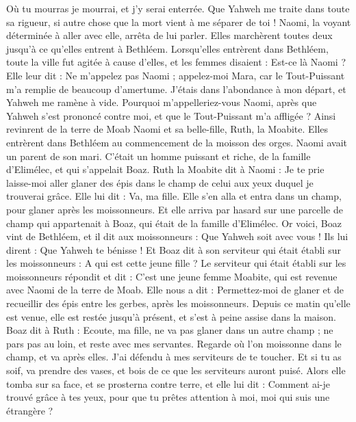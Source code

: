 \begin{multicols}{2}
Où tu mourras je mourrai, et j'y serai enterrée. Que Yahweh me traite dans toute sa rigueur, si autre chose que la mort vient à me séparer de toi !
Naomi, la voyant déterminée à aller avec elle, arrêta de lui parler.
Elles marchèrent toutes deux jusqu'à ce qu'elles entrent à Bethléem. Lorsqu'elles entrèrent dans Bethléem, toute la ville fut agitée à cause d'elles, et les femmes disaient : Est-ce là Naomi ?
Elle leur dit : Ne m'appelez pas Naomi ; appelez-moi Mara, car le Tout-Puissant m'a remplie de beaucoup d'amertume.
J’étais dans l'abondance à mon départ, et Yahweh me ramène à vide. Pourquoi m'appelleriez-vous Naomi, après que Yahweh s'est prononcé contre moi, et que le Tout-Puissant m'a affligée ?
Ainsi revinrent de la terre de Moab Naomi et sa belle-fille, Ruth, la Moabite. Elles entrèrent dans Bethléem au commencement de la moisson des orges.
\VerseOne{}Naomi avait un parent de son mari. C'était un homme puissant et riche, de la famille d'Elimélec, et qui s’appelait Boaz.
Ruth la Moabite dit à Naomi : Je te prie laisse-moi aller glaner des épis dans le champ de celui aux yeux duquel je trouverai grâce. Elle lui dit : Va, ma fille.
Elle s'en alla et entra dans un champ, pour glaner après les moissonneurs. Et elle arriva par hasard sur une parcelle de champ qui appartenait à Boaz, qui était de la famille d'Elimélec.
Or voici, Boaz vint de Bethléem, et il dit aux moissonneurs : Que Yahweh soit avec vous ! Ils lui dirent : Que Yahweh te bénisse !
Et Boaz dit à son serviteur qui était établi sur les moissonneurs : A qui est cette jeune fille ?
Le serviteur qui était établi sur les moissonneurs répondit et dit : C'est une jeune femme Moabite, qui est revenue avec Naomi de la terre de Moab.
Elle nous a dit : Permettez-moi de glaner et de recueillir des épis entre les gerbes, après les moissonneurs. Depuis ce matin qu'elle est venue, elle est restée jusqu'à présent, et s'est à peine assise dans la maison.
Boaz dit à Ruth : Ecoute, ma fille, ne va pas glaner dans un autre champ ; ne pars pas au loin, et reste avec mes servantes.
Regarde où l'on moissonne dans le champ, et va après elles. J'ai défendu à mes serviteurs de te toucher. Et si tu as soif, va prendre des vases, et bois de ce que les serviteurs auront puisé.
Alors elle tomba sur sa face, et se prosterna contre terre, et elle lui dit : Comment ai-je trouvé grâce à tes yeux, pour que tu prêtes attention à moi, moi qui suis une étrangère ?

\end{multicols}
